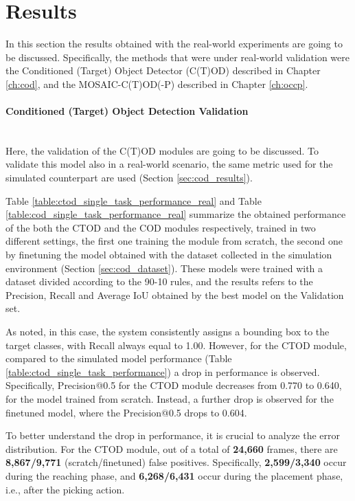 \section{Results}
\label{sec:real_results}
In this section the results obtained with the real-world experiments are going to be discussed.
Specifically, the methods that were under real-world validation were the Conditioned (Target) Object Detector (C(T)OD) described in Chapter \ref{ch:cod}, and the MOSAIC-C(T)OD(-P) described in Chapter \ref{ch:occp}.

\paragraph*{Conditioned (Target) Object Detection Validation}\mbox{}\\
Here, the validation of the C(T)OD modules are going to be discussed. To validate this model also in a real-world scenario, the same metric used for the simulated counterpart are used (Section \ref{sec:cod_results}). 

Table \ref{table:ctod_single_task_performance_real} and Table \ref{table:cod_single_task_performance_real} summarize the obtained performance of the both the CTOD and the COD modules respectively, trained in two different settings, the first one training the module from scratch, the second one by finetuning the model obtained with the dataset collected in the simulation environment (Section \ref{sec:cod_dataset}). These models were trained with a dataset divided according to the 90-10 rules, and the results refers to the Precision, Recall and Average IoU obtained by the best model on the Validation set.




As noted, in this case, the system consistently assigns a bounding box to the target classes, with Recall always equal to 1.00. However, for the CTOD module, compared to the simulated model performance (Table \ref{table:ctod_single_task_performance}) a drop in performance is observed. Specifically, Precision@0.5 for the CTOD module decreases from 0.770 to 0.640, for the model trained from scratch. Instead, a further drop is observed for the finetuned model, where the Precision@0.5 drops to 0.604.

To better understand the drop in performance, it is crucial to analyze the error distribution. For the CTOD module, out of a total of \textbf{24,660} frames, there are \textbf{8,867/9,771} (scratch/finetuned) false positives. Specifically, \textbf{2,599/3,340} occur during the reaching phase, and \textbf{6,268/6,431} occur during the placement phase, i.e., after the picking action. 

